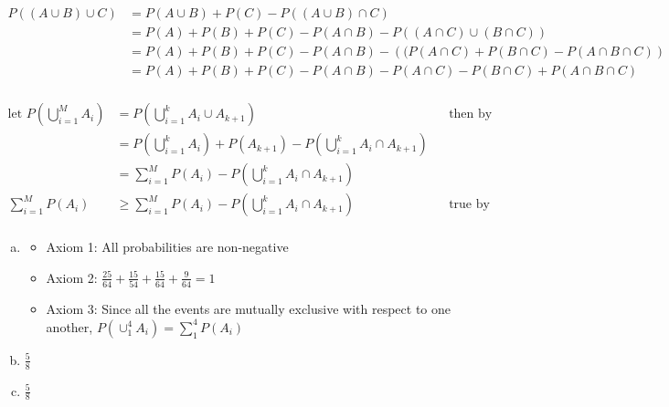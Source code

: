 \documentclass[12pt]{article}
\newenvironment{problem}[2][Problem]{\begin{trivlist}
\item[\hskip \labelsep {\bfseries #1}\hskip \labelsep {\bfseries #2.}]
  \vspace{1 cm}
}{\end{trivlist}}
\begin{document}
\begin{problem}{2.9}
  \begin{align*}%
    P((A \cup B) \cup C) &= P(A \cup B) + P(C) - P((A \cup B) \cap C) \\
    &= P(A) + P(B) + P(C) - P(A \cap B) - P((A \cap C) \cup (B \cap C)) \\ 
    &= P(A) + P(B) + P(C) - P(A \cap B) - \left((P(A \cap C) + P(B \cap C) - P(A \cap B \cap C)\right) \\
    &= P(A) + P(B) + P(C) - P(A \cap B) - P(A \cap C) - P(B \cap C) + P(A \cap B \cap C) \\
  \end{align*}%
\end{problem}

\begin{problem}{2.11}
  \begin{align*} %
    \textrm{let }  P\left( \bigcup_{i=1}^M A_i \right) &= P\left( \bigcup_{i=1}^k A_i \cup A_{k+1} \right) & & \textrm{then by theorem 2.1} \\
    &= P\left( \bigcup_{i=1}^k A_i \right) + P(A_{k+1}) - P\left( \bigcup_{i=1}^k A_i \cap A_{k+1} \right) \\
    &= \sum_{i=1}^M P(A_i) - P\left( \bigcup_{i=1}^k A_i \cap A_{k+1} \right) \\
    \sum_{i=1}^M P(A_i) &\geq \sum_{i=1}^M P(A_i) - P\left( \bigcup_{i=1}^k A_i \cap A_{k+1} \right) & & \textrm{true by inspection} \\
  \end{align*}%
\end{problem}

\newpage

\begin{problem}{2.13}
\item%
  \begin{enumerate}[a.]
    \item
      \begin{itemize}
        \item Axiom 1: All probabilities are non-negative
        \item Axiom 2: $\frac{25}{64} + \frac{15}{54} + \frac{15}{64} + \frac{9}{64} = 1$
        \item Axiom 3: Since all the events are mutually exclusive with respect to one another, $P(\cup_1^4 A_i) = \sum_1^4 P(A_i)$
      \end{itemize}
    \item $\frac{5}{8}$
    \item $\frac{5}{8}$
  \end{enumerate}%
\end{problem}
\end{document}
